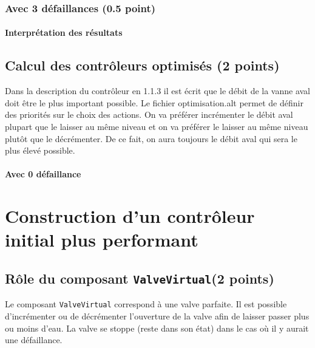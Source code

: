 \documentclass[a4paper]{book}
\begin{document}
\subsubsection{Avec 3 défaillances (0.5 point)}




%
\paragraph{Interprétation des résultats}

\subsection{Calcul des contrôleurs optimisés (2 points)}

Dans la description du contrôleur en 1.1.3 il est écrit que le débit de la vanne aval doit être le plus important possible.
Le fichier optimisation.alt permet de définir des priorités sur le choix des actions. On va préférer incrémenter le débit aval plupart que le laisser au même niveau et on va préférer le laisser au même niveau plutôt que le décrémenter. De ce fait, on aura toujours le débit aval qui sera le plus élevé possible.
\paragraph{Avec 0 défaillance}


\section{Construction d'un contrôleur initial plus performant}
\subsection{Rôle du composant {\tt ValveVirtual}(2 points)}
Le composant {\tt ValveVirtual} correspond à une valve parfaite. Il est possible d'incrémenter ou de décrémenter l'ouverture de la valve afin de laisser passer plus ou moins d'eau. La valve se stoppe (reste dans son état) dans le cas où il y aurait une défaillance.
\end{document}
